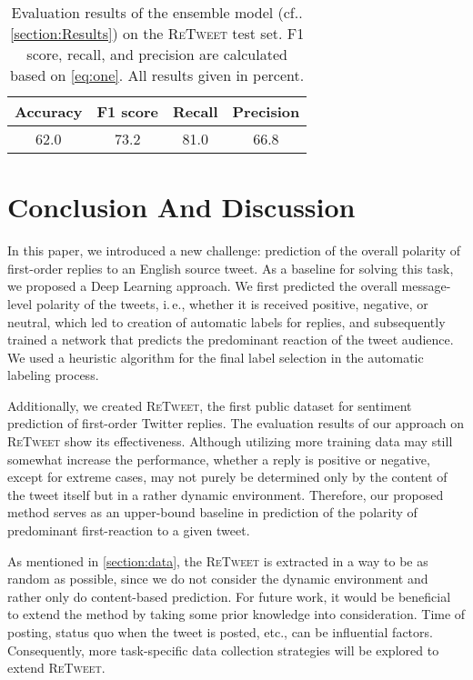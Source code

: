 \documentclass[conference]{IEEEtran}
\makeatletter
\DeclareRobustCommand\onedot{\futurelet\@let@token\@onedot}
\def\@onedot{\ifx\@let@token.\else.\null\fi\xspace}
\newcommand{\cf}{cf\onedot}
\newcommand{\ie}{i.\,e.,\xspace}
\newcommand{\retweet}{\textsc{ReTweet}\xspace}
\makeatother
\begin{document}
\begin{table}[t]
\centering
\caption{Evaluation results of the ensemble model (\cf\cref{section:Results}) on the \retweet test set. F1 score, recall, and precision are calculated based on \cref{eq:one}. All results given in percent.}
\label{tab:ensemble}
\begin{tabular}{cccc} 
\toprule
\textbf{Accuracy} & \textbf{F1 score} & \textbf{Recall} & \textbf{Precision} \\
\midrule
62.0 & 73.2 & 81.0 & 66.8 \\
\bottomrule
\end{tabular}
\end{table}

\section{Conclusion And Discussion}
\label{section:Discussion}
In this paper, we introduced a new challenge: prediction of the overall polarity of first-order replies to an English source tweet. As a baseline for solving this task, we proposed a Deep Learning approach. 
We first predicted the overall message-level polarity of the tweets, \ie whether it is received positive, negative, or neutral, which led to creation of automatic labels for replies, and subsequently trained a network that predicts the predominant reaction of the tweet audience. 
We used a heuristic algorithm for the final label selection in the automatic labeling process.

Additionally, we created \retweet, the first public dataset for sentiment prediction of first-order Twitter replies. 
The evaluation results of our approach on \retweet show its effectiveness.
Although utilizing more training data may still somewhat increase the performance, whether a reply is positive or negative, except for extreme cases, may not purely be determined only by the content of the tweet itself but in a rather dynamic environment. Therefore, our proposed method serves as an upper-bound baseline in prediction of the polarity of predominant first-reaction to a given tweet.

As mentioned in \cref{section:data}, the \retweet is extracted in a way to be as random as possible, since we do not consider the dynamic environment and rather only do content-based prediction.
For future work, it would be beneficial to extend the method by taking some prior knowledge into consideration. Time of posting, status quo when the tweet is posted, etc., can be influential factors.
Consequently, more task-specific data collection strategies will be explored to extend  \retweet.





\end{document}
